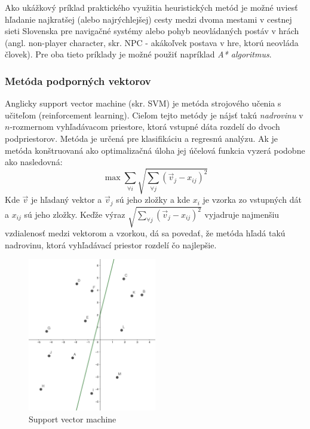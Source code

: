 Ako ukážkový príklad praktického využitia heuristických metód je možné uviesť hľadanie najkratšej (alebo najrýchlejšej)
cesty medzi dvoma mestami v cestnej sieti Slovenska pre navigačné systémy alebo pohyb neovládaných postáv v hrách
(angl. non-player character, skr. NPC - akákoľvek postava v hre, ktorú neovláda človek).
Pre oba tieto príklady je možné použiť napríklad \emph{A* algoritmus}.

\subsubsection{Metóda podporných vektorov}

Anglicky support vector machine (skr. SVM) je metóda strojového učenia s učiteľom (reinforcement learning).
Cieľom tejto metódy je nájsť takú \emph{nadrovinu} v $n$-rozmernom vyhľadávacom priestore, ktorá vstupné dáta rozdelí
do dvoch podpriestorov.
Metóda je určená pre klasifikáciu a regresnú analýzu.
Ak je metóda konštruovaná ako optimalizačná úloha jej účelová funkcia vyzerá podobne ako nasledovná:
\begin{equation}
    \max \sum_{\forall i}{\sqrt{\sum_{\forall j}{(\vec{v}_j - x_{ij})^2}}}
\end{equation}
Kde $\vec{v}$ je hľadaný vektor a $\vec{v}_j$ sú jeho zložky a kde $x_i$ je vzorka zo vstupných dát a $x_{ij}$ sú jeho
zložky.
Keďže výraz $\sqrt{\sum_{\forall j}{(\vec{v}_j - x_{ij})^2}}$ vyjadruje najmenšiu vzdialenosť medzi vektorom a
vzorkou, dá sa povedať, že metóda hľadá takú nadrovinu, ktorá vyhľadávací priestor rozdelí čo najlepšie.
\begin{figure}[H]
    \centering
    \includegraphics[width=0.5\textwidth]{images/svm.png}
    \caption{Support vector machine}
\end{figure}\label{figure:svm}

